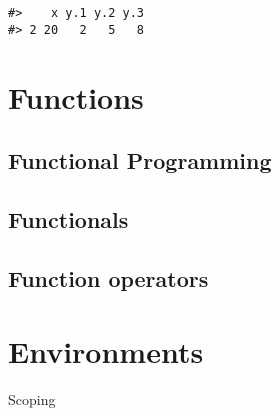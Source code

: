\documentclass[]{book}
\theoremstyle{definition}
\theoremstyle{definition}
\theoremstyle{definition}
\theoremstyle{remark}
\begin{document}
\begin{verbatim}
#>    x y.1 y.2 y.3
#> 2 20   2   5   8
\end{verbatim}

\section{Functions}\label{functions}

\subsection{Functional Programming}\label{functional-programming}

\subsection{Functionals}\label{functionals}

\subsection{Function operators}\label{function-operators}

\section{Environments}\label{environments}

Scoping


\end{document}
